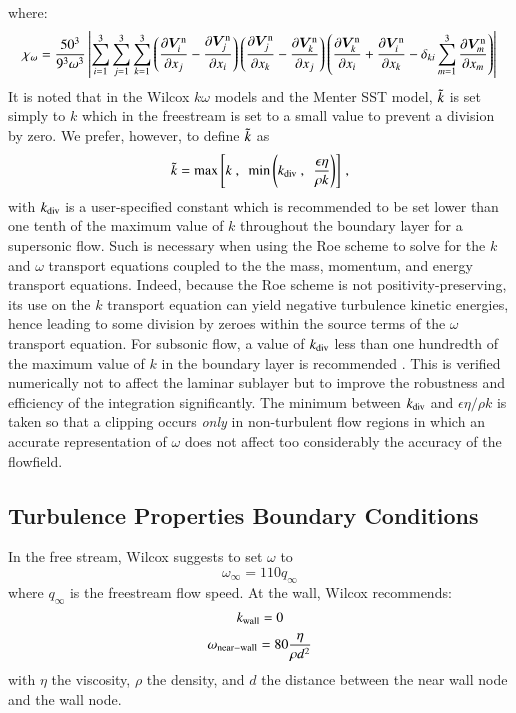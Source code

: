 \documentclass{warpdoc}
\newcommand{\mfd}{\displaystyle}
\newcommand{\visc}{\eta}
\renewcommand{\vec}[1]{\bm{#1}}
\begin{document}
%
where:
%
\begin{equation}\mfd
\chi_\omega=\frac{50^3}{9^3 \omega^3}
\left|
\sum_{i=1}^3 \sum_{j=1}^3 \sum_{k=1}^3 
\left(\frac{\partial \vec{V}^{\rm n}_i}{\partial x_j}-\frac{\partial \vec{V}^{\rm n}_j}{\partial x_i} \right)
\left(\frac{\partial \vec{V}^{\rm n}_j}{\partial x_k}-\frac{\partial \vec{V}^{\rm n}_k}{\partial x_j} \right)
\left(\frac{\partial \vec{V}^{\rm n}_k}{\partial x_i}+\frac{\partial \vec{V}^{\rm n}_i}{\partial x_k} 
     - \delta_{ki}\sum_{m=1}^3\frac{\partial \vec{V}^{\rm n}_m}{\partial x_m}  \right)
\right|
\end{equation}
%
It is noted that in the Wilcox $k\omega$ models and the Menter SST model, $\tilde{k}$ is
set simply to $k$ which in the freestream is set to a small
value to prevent a division by zero. We prefer, however,  to define $\tilde{k}$ as
%
\begin{equation}
  \wtilde{k}={\rm max}\left[ k ~,~~\min \left(k_{\rm div}~,
                 ~~\frac{\epsilon \visc} {\rho k}\right)\right] \, ,
  \label{eqn:ktilde}
\end{equation}
%
with $k_{\rm div}$ is a user-specified constant which is recommended to be set lower than
one tenth of the maximum value of $k$ throughout the boundary layer for a supersonic flow. Such is necessary when using the Roe scheme to solve for the $k$ and $\omega$ transport equations coupled to the the mass, momentum, and energy transport equations. Indeed, because the Roe scheme is not positivity-preserving, its use on the $k$ transport equation can yield negative turbulence kinetic energies, hence leading to some division by zeroes within the source terms of the $\omega$ transport equation.  
For subsonic flow, a value of $k_{\rm div}$ less than one hundredth of the maximum
value of $k$ in the boundary layer is recommended \cite{aiaa:2002:parent}. This is
verified numerically not to affect the laminar sublayer
but to improve the robustness and efficiency of the integration significantly.
The minimum between $k_{\rm div}$ and $\epsilon \visc / \rho k$ is taken so that a
clipping occurs \emph{only} in non-turbulent flow regions in which an accurate
representation of $\omega$ does not affect too considerably the accuracy of the flowfield.


\subsection{Turbulence Properties Boundary Conditions}

In the free stream, Wilcox \cite{aiaa:2008:wilcox} suggests to set $\omega$ to 
%
\begin{equation}
  \omega_\infty=110 q_\infty
\end{equation}
%
where $q_\infty$ is the freestream flow speed.
At the wall, Wilcox recommends:
%
\begin{equation}
k_{\rm wall}=0
\end{equation}
%
\begin{equation}
\omega_{\rm near-wall}=80\frac{\eta}{\rho d^2}
\end{equation}
%
with $\eta$ the viscosity, $\rho$ the density, and $d$ the distance between the near wall node and the wall node.
\end{document}
